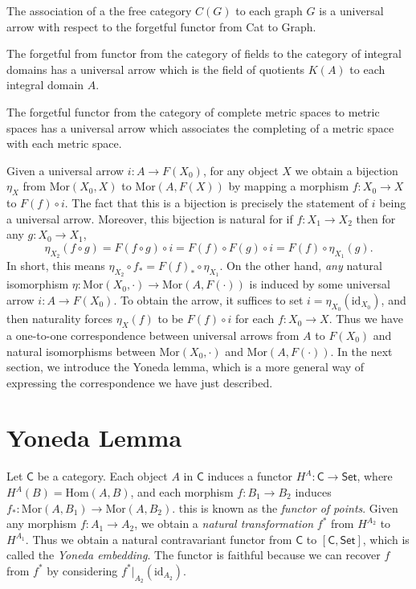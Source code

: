 \begin{example}
    The association of a the free category $C(G)$ to each graph $G$ is a universal arrow with respect to the forgetful functor from {\sf Cat} to {\sf Graph}.
\end{example}

\begin{example}
    The forgetful from functor from the category of fields to the category of integral domains has a universal arrow which is the field of quotients $K(A)$ to each integral domain $A$.
\end{example}

\begin{example}
    The forgetful functor from the category of complete metric spaces to metric spaces has a universal arrow which associates the completing of a metric space with each metric space.
\end{example}

Given a universal arrow $i: A \to F(X_0)$, for any object $X$ we obtain a bijection $\eta_X$ from $\text{Mor}(X_0,X)$ to $\text{Mor}(A,F(X))$ by mapping a morphism $f: X_0 \to X$ to $F(f) \circ i$. The fact that this is a bijection is precisely the statement of $i$ being a universal arrow. Moreover, this bijection is natural for if $f: X_1 \to X_2$ then for any $g: X_0 \to X_1$,
%
\[ \eta_{X_2}(f \circ g) = F(f \circ g) \circ i = F(f) \circ F(g) \circ i = F(f) \circ \eta_{X_1}(g).  \]
%
In short, this means $\eta_{X_2} \circ f_* = F(f)_* \circ \eta_{X_1}$. On the other hand, \emph{any} natural isomorphism $\eta: \text{Mor}(X_0,\cdot) \to \text{Mor}(A,F(\cdot))$ is induced by some universal arrow $i: A \to F(X_0)$. To obtain the arrow, it suffices to set $i = \eta_{X_0}(\text{id}_{X_0})$, and then naturality forces $\eta_X(f)$ to be $F(f) \circ i$ for each $f: X_0 \to X$. Thus we have a one-to-one correspondence between universal arrows from $A$ to $F(X_0)$ and natural isomorphisms between $\text{Mor}(X_0,\cdot)$ and $\text{Mor}(A,F(\cdot))$. In the next section, we introduce the Yoneda lemma, which is a more general way of expressing the correspondence we have just described.

\section{Yoneda Lemma}

Let $\mathsf{C}$ be a category. Each object $A$ in $\mathsf{C}$ induces a functor $H^A: \mathsf{C} \to \mathsf{Set}$, where $H^A(B) = \text{Hom}(A,B)$, and each morphism $f: B_1 \to B_2$ induces $f_*: \text{Mor}(A,B_1) \to \text{Mor}(A,B_2)$. this is known as the \emph{functor of points}. Given any morphism $f: A_1 \to A_2$, we obtain a \emph{natural transformation} $f^*$ from $H^{A_2}$ to $H^{A_1}$. Thus we obtain a natural contravariant functor from $\mathsf{C}$ to $[\mathsf{C}, \mathsf{Set}]$, which is called the \emph{Yoneda embedding}. The functor is faithful because we can recover $f$ from $f^*$ by considering $f^*|_{A_2}(\text{id}_{A_2})$.


